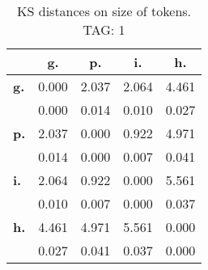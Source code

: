 \begin{table}[h!]
\begin{center}
\begin{tabular}{| l || c | c | c | c |}\hline
 & {\bf g.} & {\bf p.} & {\bf i.} & {\bf h.} \\\hline\hline
{\bf g.} & 0.000 & 2.037 & 2.064 & 4.461 \\
{\bf } & 0.000 & 0.014 & 0.010 & 0.027 \\\hline
{\bf p.} & 2.037 & 0.000 & 0.922 & 4.971 \\
{\bf } & 0.014 & 0.000 & 0.007 & 0.041 \\\hline
{\bf i.} & 2.064 & 0.922 & 0.000 & 5.561 \\
{\bf } & 0.010 & 0.007 & 0.000 & 0.037 \\\hline
{\bf h.} & 4.461 & 4.971 & 5.561 & 0.000 \\
{\bf } & 0.027 & 0.041 & 0.037 & 0.000 \\\hline
\end{tabular}
\caption{KS distances on size of tokens. TAG: 1}
\end{center}
\end{table}